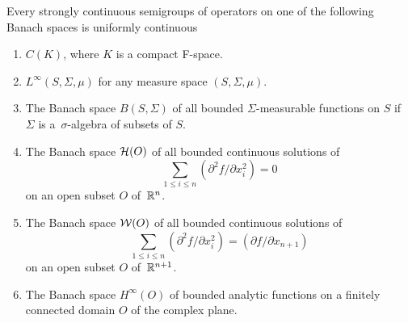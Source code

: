 \begin{theorem}\label{thm:a2-3.6}
Every strongly continuous semigroups of operators on one of the following Banach spaces is uniformly continuous
\begin{enumerate}[\upshape (i)]
\item \label{thm:a2-3.6-1}
$C(K)$, where $K$ is a compact F-space.
\item \label{thm:a2-3.6-2}
$L^{\infty}(S,\Sigma,\mu)$ for any measure space $(S,\Sigma,\mu)$.
\item \label{thm:a2-3.6-3}
The Banach space $B(S,\Sigma)$ of all bounded $\Sigma$-measurable functions on $S$ if \,$\Sigma$ is a \,$\sigma$-algebra of subsets of $S$.
\item \label{thm:a2-3.6-4}
The Banach space $\mathcal{H}(O)$ of all bounded continuous solutions of
\[
\sum_{1 \leq i \leq n} (\partial^2f/\partial x_i^2) = 0
\]
on an open subset $O$ of \,$\mathbb{R}^n$.
\item \label{thm:a2-3.6-5}
The Banach space $\mathcal{W}(O)$ of all bounded continuous solutions of
\[
\sum_{1 \leq i \leq n} (\partial^2f/\partial x_i^2) = (\partial f/\partial x_{n+1})
\]
on an open subset $O$ of \,$\mathbb{R}^{n+1}$.
\item \label{thm:a2-3.6-6}
The Banach space $H^{\infty}(O)$ of bounded analytic functions on a finitely connected domain $O$ of the complex plane.
\end{enumerate}
\end{theorem}

